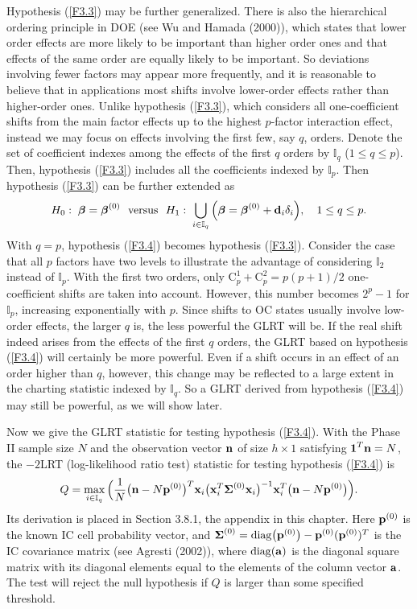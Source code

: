 Hypothesis (\ref{F3.3}) may be further generalized. There is also the hierarchical
ordering principle in DOE (see Wu and Hamada (2000)), which states that lower order
effects are more likely to be important than higher order ones and that effects of
the same order are equally likely to be important. So deviations involving fewer
factors may appear more frequently, and it is reasonable to believe that in
applications most shifts involve lower-order effects rather than higher-order ones.
Unlike hypothesis (\ref{F3.3}), which considers all one-coefficient shifts from the
main factor effects up to the highest $p$-factor interaction effect, instead we may
focus on effects involving the first few, say $q$, orders. Denote the set of
coefficient indexes among the effects of the first $q$ orders by $\mathbb{I}_q$
($1\leq q\leq p$). Then, hypothesis (\ref{F3.3}) includes all the coefficients
indexed by $\mathbb{I}_p$. Then hypothesis (\ref{F3.3}) can be further extended as
\begin{align}
H_0:\;\bm{\beta}=\bm{\beta}^{(0)}\ \ \mbox{versus}\ \
H_1:\;\bigcup_{i\in\mathbb{I}_q}\Big(\bm{\beta}=\bm{\beta}^{(0)}+{\bf
d}_i\delta_i\Big),\quad 1\leq q\leq p.\label{F3.4}
\end{align}
With $q=p$, hypothesis (\ref{F3.4}) becomes hypothesis (\ref{F3.3}). Consider the
case that all $p$ factors have two levels to illustrate the advantage of considering
$\mathbb{I}_2$ instead of $\mathbb{I}_p$. With the first two orders, only
$\mathrm{C}_p^1+\mathrm{C}_p^2=p(p+1)/2$ one-coefficient shifts are taken into
account. However, this number becomes $2^p-1$ for $\mathbb{I}_p$, increasing
exponentially with $p$. Since shifts to OC states usually involve low-order effects,
the larger $q$ is, the less powerful the GLRT will be. If the real shift indeed
arises from the effects of the first $q$ orders, the GLRT based on hypothesis
(\ref{F3.4}) will certainly be more powerful. Even if a shift occurs in an effect of
an order higher than $q$, however, this change may be reflected to a large extent in
the charting statistic indexed by $\mathbb{I}_q$. So a GLRT derived from hypothesis
(\ref{F3.4}) may still be powerful, as we will show later.

Now we give the GLRT statistic for testing hypothesis (\ref{F3.4}). With the Phase
II sample size $N$ and the observation vector ${\bf n}$ of size $h\times 1$
satisfying $\boldsymbol1^T{\bf n}=N$, the $-2$LRT (log-likelihood ratio test) statistic for
testing hypothesis (\ref{F3.4}) is
\begin{equation}
Q=\max_{i\in\mathbb{I}_q}\Big(\frac{1}{N}\big({\bf n}-N{\bf p}^{(0)}\big)^T{\bf
x}_i\big({\bf x}_i^T\bm{\Sigma}^{(0)}{\bf x}_i\big)^{-1}{\bf x}_i^T\big({\bf
n}-N{\bf p}^{(0)}\big)\Big).\label{F3.5}
\end{equation}
Its derivation is placed in Section 3.8.1, the appendix in this chapter. Here ${\bf
p}^{(0)}$ is the known IC cell probability vector, and
$\boldsymbol{\Sigma}^{(0)}=\mathrm{diag}\big({\bf p}^{(0)}\big)-{\bf p}^{(0)}({\bf p}^{(0)})^T$ is the
IC covariance matrix (see Agresti (2002)), where $\mathrm{diag}({\bf a})$ is the diagonal
square matrix with its diagonal elements equal to the elements of the column vector
${\bf a}$. The test will reject the null hypothesis if $Q$ is larger than some
specified threshold.


